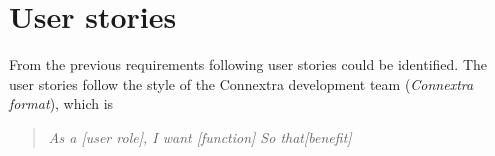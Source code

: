 \chapter{User stories}

From the previous requirements following user stories could be identified. The user stories follow the style of the Connextra development team (\textit{Connextra format}), which is %
\begin{quote}
\textit{As a [user role], \newline I want [function] \newline So that[benefit]}
\end{quote}

